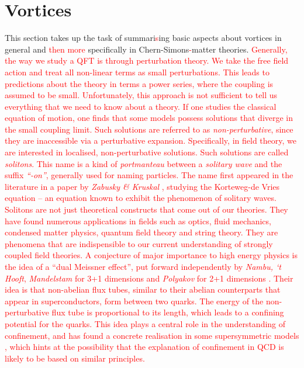         \section{Vortices} \label{vortices_sec}
This section takes up the task of summari\textcolor{red}{s}ing basic aspects about vortices in general and \textcolor{red}{then more} specifically in Chern-Simons\textcolor{red}{-}matter theories.
       \textcolor{red}{ Generally, the way we study a QFT is through perturbation theory. We take the free field action and treat all non-linear terms as small perturbations. This leads to predictions about the theory in terms a power series, where the coupling is assumed to be small. Unfortunately, this approach is not sufficient to tell us everything that we need to know about a theory. If one studies the classical equation of motion, one finds that some models possess solutions that diverge in the small coupling limit. Such solutions are referred to as \textit{non-perturbative}, since they are inaccessible via a perturbative expansion. Specifically, in field theory, we are interested in localised, non-perturbative solutions. Such solutions are called \textit{solitons}. This name is a kind of \textit{portmanteau} between a \textit{solitary wave} and the suffix \textit{``-on''}, generally used for naming particles. The name first appeared in the literature in a paper by \textit{Zabusky \& Kruskal} \cite{PhysRevLett.15.240}, studying the Korteweg-de Vries equation -- an equation known to exhibit the phenomenon of solitary waves. }\\
       \indent \textcolor{red}{Solitons are not just theoretical constructs that come out of our theories. They have found numerous applications in fields such as optics, fluid mechanics, condensed matter physics, quantum field theory and string theory. They are phenomena that are indispensible to our current understanding of strongly coupled field theories. A conjecture of major importance to high energy physics is the idea of a ``dual Meissner effect'', put forward independently by \textit{Nambu, `t Hooft}, \textit{Mandelstam} for 3+1 dimensions and  \textit{Polyakov} for 2+1 dimensions \cite{Mandelstam:1974pi, tHooft:1974kcl, PhysRevD.10.4262, Polyakov1977}. Their idea is that non-abelian flux tubes, similar to their abelian counterparts that appear in superconductors, form between two quarks. The energy of the non-perturbative flux tube is proportional to its length, which leads to a confining potential for the quarks. This idea plays a central role in the understanding of confinement, and has found a concrete realisation in some supersymmetric models \cite{Seiberg1994, Seiberg:1994rs}, which hints at the possibility that the explanation of confinement in QCD is likely to be based on similar principles.  }

